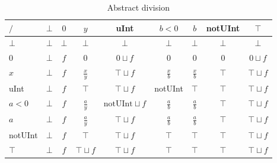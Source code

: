 \begin{table}[htbp]
\centering
\begin{tabular}{l|cccccccc}
$/$     & $\bot$ & $0$    & $y$             & uInt                     & $b < 0$       & $b$           & notUInt & $\top$          \\\hline
$\bot$  & $\bot$ & $\bot$ & $\bot$          & $\bot$                   & $\bot$        & $\bot$        & $\bot$  & $\bot$          \\
$0$     & $\bot$ & $f$    & $0$             & $0\sqcup f$              & $0$           & $0$           & $0$     & $0\sqcup f$     \\
$x$     & $\bot$ & $f$    & $\frac{x}{y}$   & $\top \sqcup f$          & $\frac{x}{b}$ & $\frac{x}{b}$ & $\top$  & $\top \sqcup f$ \\
uInt    & $\bot$ & $f$    & $\top$          & $\top \sqcup f$          & notUInt       & $\top$        & $\top$  & $\top \sqcup f$ \\
$a < 0$ & $\bot$ & $f$    & $\frac{a}{y}$    & $\text{notUInt}\sqcup f$ & $\frac{a}{b}$ & $\frac{a}{b}$ & $\top$  & $\top \sqcup f$ \\
$a$     & $\bot$ & $f$    & $\frac{a}{y}$    & $\top \sqcup f$          & $\frac{a}{b}$ & $\frac{a}{b}$ & $\top$  & $\top \sqcup f$ \\
notUInt & $\bot$ & $f$    & $\top$          & $\top \sqcup f$          & $\top$        & $\top$        & $\top$  & $\top \sqcup f$ \\
$\top$  & $\bot$ & $f$    & $\top \sqcup f$ & $\top \sqcup f$          & $\top$        & $\top$        & $\top$  & $\top \sqcup f$
\end{tabular}
\caption{Abstract division}
\label{tab:abstract_division}
\end{table}

